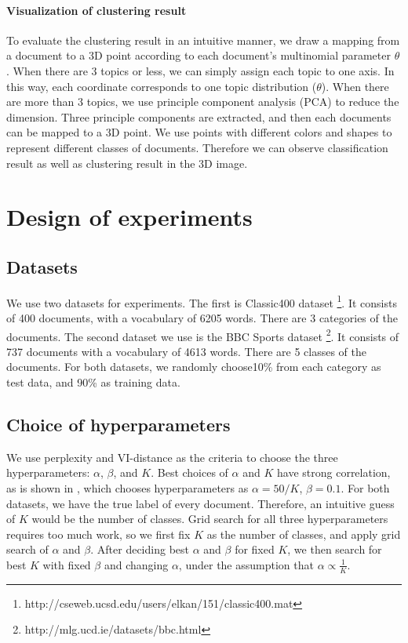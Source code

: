 \documentclass{article} %
\begin{document}
\paragraph{Visualization of clustering result} \hspace{0pt} To evaluate the clustering result in an intuitive manner, we draw a mapping from a document to a 3D point according to each document's multinomial parameter $\theta$. When there are 3 topics or less, we can simply assign each topic to one axis. In this way, each coordinate corresponds to one topic distribution ($\theta$). When there are more than 3 topics, we use principle component analysis (PCA) to reduce the dimension. Three principle components are extracted, and then each documents can be mapped to a 3D point. We use points with different colors and shapes to represent different classes of documents. Therefore we can observe classification result as well as clustering result in the 3D image.
\label{implementation}


\section{Design of experiments}
\subsection{Datasets}
We use two datasets for experiments. The first is Classic400 dataset \footnote{ http://cseweb.ucsd.edu/users/elkan/151/classic400.mat}. It consists of 400 documents, with a vocabulary of 6205 words. There are 3 categories of the documents. The second dataset we use is the BBC Sports dataset \footnote{http://mlg.ucd.ie/datasets/bbc.html}. It consists of 737 documents with a vocabulary of 4613 words. There are 5 classes of the documents. For both datasets, we randomly choose10\% from each category as test data, and 90\% as training data.

\subsection{Choice of hyperparameters}
We use perplexity and VI-distance as the criteria to choose the three hyperparameters: $\alpha$, $\beta$, and $K$. 
Best choices of $\alpha$ and $K$ have strong correlation, as is shown in \cite{finding},  which chooses hyperparameters as $\alpha = 50/K$, $\beta=0.1$. For both datasets, we have the true label of every document. Therefore, an intuitive guess of $K$ would be the number of classes. Grid search for all three hyperparameters requires too much work, so we first fix $K$ as the number of classes, and apply grid search of $\alpha$ and $\beta$. After deciding best $\alpha$ and $\beta$ for fixed $K$, we then search for best $K$ with fixed $\beta$ and changing $\alpha$, under the assumption that $\alpha \propto \frac{1}{K}$.
\end{document}
